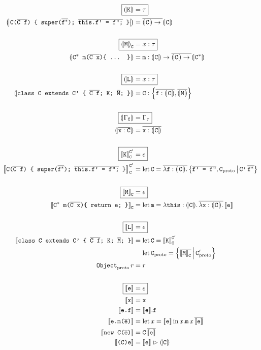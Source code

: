 \begin{align*}    
    \Aboxed{\denoty{\fj K} &= \tau} \\
    \denoty{\fjconsdef} &= \overline{\denoty{\fj C} \to {}} \denoty{\fj{C}} \\
    \\
    \Aboxed{\denoty{\fj M}_{\fj C} &= x : \tau} \\
    \denoty{\fjmethdefx} &= \fj m : \denoty{\fj C} \to \overline{\denoty{\fj C} \to {}} \denoty{\fj{C}^*} \\
    \\
    \Aboxed{\denoty{\fj L} &= x : \tau} \\
    \denoty{\fjclassdef} &= \fj C : \flrec{\overline{\fj{f}: \denoty{\fj{C}}}, \overline{\denoty{\fj M}}} \\
    \\
    \Aboxed{\denoty{\Gamma_{\fj C}} &= \Gamma_\tau} \\
    \denoty{\overline{\fj x : \fj C}} &= \overline{\fj x : \denoty{\fj C}} \\
    \\
    \Aboxed{\denot{\fj K}_{\fj{C}}^{\fj{C}'} &= e} \\
    \denot{\fjconsdef}_{\fj{C}}^{\fj{C}'} &= \flletx{\fj C}{\overline{\fllam{\fj f : \denoty{\fj C}}}\, \flext{\fj{\fjoverline{f' = f''}}, \fj C_\mathrm{proto}}{\fj{C'}\,\overline{\fj{f}^*}}}
    \\ \\
    \Aboxed{\denot{\fj M}_{\fj C} &= e} \\
    \denot{\fjmethdef}_{\fj C} &= \flletx{\fj m}{\fllam{\fj{this} : \denoty{\fj C}} \overline{\fllam{\fj x: \denoty{\fj C}}}\, \denot{\fj e}}
    \\ \\
    \Aboxed{\denot{\fj L} &= e} \\
    \denot{\fjclassdef} &= \flletx{\fj C}{\denot{\fj K}_{\fj C}^{\fj C'}} \\
    &\phantom{{}={}} \flletx{\fj{C}_\mathrm{proto}}{\flext{\overline{\denot{\fj M}_{\fj C}}}{\fj C'_\mathrm{proto}}} \\
    \fj{Object}_\mathrm{proto}\,r &= r
    \\ \\
    \Aboxed{\denot{\fj e} &= e} \\
    \denot{\fj x} &= \fj x \\
    \denot{\fj {e.f}} &= \flproj{\denot{\fj e}}{\fj f} \\
    \denot{\fj {e.m(\fjoverline e)}} &= \fllet{x}{\denot{\fj e}} \flproj{x}{\fj m}\,x\,\overline{\denot{\fj e}} \\
    \denot{\fj {new C(\fjoverline e)}} &= \fj{C}\,\overline{\denot{\fj e}} \\
    \denot{\fj {(C)e}} &= \flcast{\denot {\fj e}}{\denoty {\fj C}} 
\end{align*}